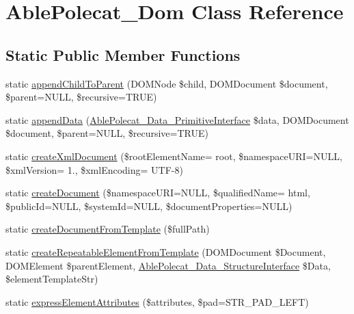 \hypertarget{class_able_polecat___dom}{}\section{Able\+Polecat\+\_\+\+Dom Class Reference}
\label{class_able_polecat___dom}
\subsection*{Static Public Member Functions}
\begin{DoxyCompactItemize}
\item 
static \hyperlink{class_able_polecat___dom_abc271ed97ae920faeed49b3b268021e7}{append\+Child\+To\+Parent} (D\+O\+M\+Node \$child, D\+O\+M\+Document \$document, \$parent=N\+U\+L\+L, \$recursive=T\+R\+U\+E)
\item 
static \hyperlink{class_able_polecat___dom_a3de7bd7631407b5f118c1c68221360f8}{append\+Data} (\hyperlink{interface_able_polecat___data___primitive_interface}{Able\+Polecat\+\_\+\+Data\+\_\+\+Primitive\+Interface} \$data, D\+O\+M\+Document \$document, \$parent=N\+U\+L\+L, \$recursive=T\+R\+U\+E)
\item 
static \hyperlink{class_able_polecat___dom_a0534ce73536edd12817f591731158a77}{create\+Xml\+Document} (\$root\+Element\+Name= \textquotesingle{}root\textquotesingle{}, \$namespace\+U\+R\+I=N\+U\+L\+L, \$xml\+Version= \textquotesingle{}1.\textquotesingle{}, \$xml\+Encoding= \textquotesingle{}U\+T\+F-\/8\textquotesingle{})
\item 
static \hyperlink{class_able_polecat___dom_aabf3a19836368661ea85c0131377750a}{create\+Document} (\$namespace\+U\+R\+I=N\+U\+L\+L, \$qualified\+Name= \textquotesingle{}html\textquotesingle{}, \$public\+Id=N\+U\+L\+L, \$system\+Id=N\+U\+L\+L, \$document\+Properties=N\+U\+L\+L)
\item 
static \hyperlink{class_able_polecat___dom_aa4ac48abbfeb24e6623769bc4577d416}{create\+Document\+From\+Template} (\$full\+Path)
\item 
static \hyperlink{class_able_polecat___dom_a5e84bb21e9029f6a7cf92c5ae4e17d38}{create\+Repeatable\+Element\+From\+Template} (D\+O\+M\+Document \$Document, D\+O\+M\+Element \$parent\+Element, \hyperlink{interface_able_polecat___data___structure_interface}{Able\+Polecat\+\_\+\+Data\+\_\+\+Structure\+Interface} \$Data, \$element\+Template\+Str)
\item 
static \hyperlink{class_able_polecat___dom_abbf61fa2c707c18ce7144318a3c292ef}{express\+Element\+Attributes} (\$attributes, \$pad=S\+T\+R\+\_\+\+P\+A\+D\+\_\+\+L\+E\+F\+T)

\end{DoxyCompactItemize}
